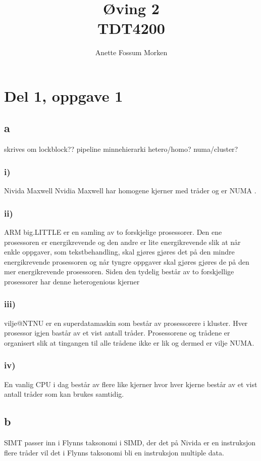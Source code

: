 \documentclass[12pt, a4paper]{article} %
\title{Øving 2\\ TDT4200}
\author[1]{Anette Fossum Morken}
\date{}
\begin{document}
\maketitle

\section*{Del 1, oppgave 1}
\subsection*{a}
skrives om lockblock?? pipeline minnehierarki hetero/homo? numa/cluster?
\subsubsection*{i)}
Nivida Maxwell Nvidia Maxwell har homogene kjerner med tråder og er NUMA .
\subsubsection*{ii)}
ARM big.LITTLE er en samling av to forskjelige prosessorer. Den ene prosessoren er energikrevende og den andre er lite energikrevende slik at når enkle oppgaver, som tekstbehandling, skal gjøres gjøres det på den mindre energikrevende prosessoren og når tyngre oppgaver skal gjøres gjøres de på den mer energikrevende prosessoren. Siden den tydelig består av to forskjellige prosessorer har denne heterogenious kjerner 

\subsubsection*{iii)}
vilje@NTNU er en superdatamaskin som består av prosessorere i kluster. Hver prosessor igjen bastår av et vist antall tråder. Prosessorene og trådene er organisert slik at tingangen til alle trådene ikke er lik og dermed er vilje NUMA.
\subsubsection*{iv)}
En vanlig CPU i dag består av flere like kjerner hvor hver kjerne består av et vist antall tråder som kan brukes samtidig.  
\subsection*{b}
SIMT passer inn i Flynns taksonomi i SIMD, der det på Nivida er en instruksjon flere tråder vil det i Flynns taksonomi bli en instruksjon multiple data. 
\end{document}
